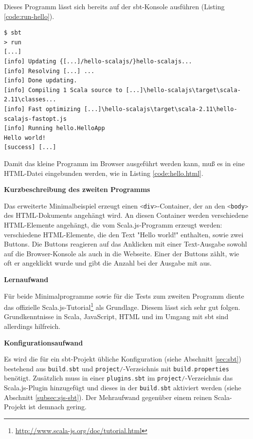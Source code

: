 \documentclass[a4paper, 12pt, hidelinks, listof=totoc, listoftables=totoc, bibliography=totoc]{scrreprt}
\newcommand{\code}[1]{\lstinline[language=Scala, style=inline]|#1|}
\newcommand{\scala}[1]{\lstinline[language=Scala, style=inline]|#1|}
\newcommand{\MyMiniSec}[1]{\rmfamily\fontsize{12}{15}\selectfont
	\vspace{7pt}\textbf{#1} %
}
\begin{document}
Dieses Programm lässt sich bereits auf der sbt-Konsole ausführen (Listing \ref{code:run-hello}).

\begin{lstlisting}[caption={Lauf des Hallo-Welt-Programms in der sbt-REPL.}, label={code:run-hello}]
$ sbt
> run
[...]
[info] Updating {[...]/hello-scalajs/}hello-scalajs...
[info] Resolving [...] ...
[info] Done updating.
[info] Compiling 1 Scala source to [...]\hello-scalajs\target\scala-2.11\classes...
[info] Fast optimizing [...]\hello-scalajs\target\scala-2.11\hello-scalajs-fastopt.js
[info] Running hello.HelloApp
Hello world!
[success] [...]
\end{lstlisting}

Damit das kleine Programm im Browser ausgeführt werden kann, muß es in eine \ac{HTML}-Datei eingebunden werden, wie in Listing \ref{code:hello.html}.




\MyMiniSec{Kurzbeschreibung des zweiten Programms}

Das erweiterte Minimalbeispiel erzeugt einen \code{<div>}-Container, der an den \code{<body>} des \ac{HTML}-Dokuments angehängt wird. An diesen Container werden verschiedene \ac{HTML}-Elemente angehängt, die vom Scala.js-Programm erzeugt werden: verschiedene \ac{HTML}-Elemente, die den Text "Hello world!" enthalten, sowie zwei Buttons. Die Buttons reagieren auf das Anklicken mit einer Text-Ausgabe sowohl auf die Browser-Konsole als auch in die Webseite. Einer der Buttons zählt, wie oft er angeklickt wurde und gibt die Anzahl bei der Ausgabe mit aus.


\MyMiniSec{Lernaufwand}

Für beide Minimalprogramme sowie für die Tests zum zweiten Programm diente das offizielle Scala.js-Tutorial\footnote{\url{http://www.scala-js.org/doc/tutorial.html}} als Grundlage. Diesem lässt sich sehr gut folgen. Grundkenntnisse in Scala, JavaScript, \ac{HTML} und im Umgang mit sbt sind allerdings hilfreich.


\MyMiniSec{Konfigurationsaufwand}

Es wird die für ein sbt-Projekt übliche Konfiguration (siehe Abschnitt \ref{sec:sbt}) bestehend aus \code{build.sbt} und \code{project/}-Verzeichnis mit \code{build.properties} benötigt. Zusätzlich muss in einer \code{plugins.sbt} im \code{project/}-Verzeichnis das Scala.js-Plugin hinzugefügt und dieses in der \code{build.sbt} aktiviert werden (siehe Abschnitt \ref{subsec:sjs-sbt}). Der Mehraufwand gegenüber einem reinen Scala-Projekt ist demnach gering. 
\end{document}
